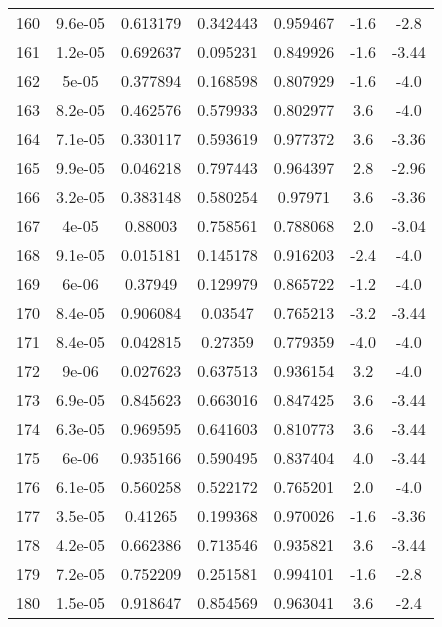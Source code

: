 \begin{table}
\begin{tabular}{c|c|c|c|c|c|c}
160 & 9.6e-05 & 0.613179 & 0.342443 & 0.959467 & -1.6 & -2.8\\
161 & 1.2e-05 & 0.692637 & 0.095231 & 0.849926 & -1.6 & -3.44\\
162 & 5e-05 & 0.377894 & 0.168598 & 0.807929 & -1.6 & -4.0\\
163 & 8.2e-05 & 0.462576 & 0.579933 & 0.802977 & 3.6 & -4.0\\
164 & 7.1e-05 & 0.330117 & 0.593619 & 0.977372 & 3.6 & -3.36\\
165 & 9.9e-05 & 0.046218 & 0.797443 & 0.964397 & 2.8 & -2.96\\
166 & 3.2e-05 & 0.383148 & 0.580254 & 0.97971 & 3.6 & -3.36\\
167 & 4e-05 & 0.88003 & 0.758561 & 0.788068 & 2.0 & -3.04\\
168 & 9.1e-05 & 0.015181 & 0.145178 & 0.916203 & -2.4 & -4.0\\
169 & 6e-06 & 0.37949 & 0.129979 & 0.865722 & -1.2 & -4.0\\
170 & 8.4e-05 & 0.906084 & 0.03547 & 0.765213 & -3.2 & -3.44\\
171 & 8.4e-05 & 0.042815 & 0.27359 & 0.779359 & -4.0 & -4.0\\
172 & 9e-06 & 0.027623 & 0.637513 & 0.936154 & 3.2 & -4.0\\
173 & 6.9e-05 & 0.845623 & 0.663016 & 0.847425 & 3.6 & -3.44\\
174 & 6.3e-05 & 0.969595 & 0.641603 & 0.810773 & 3.6 & -3.44\\
175 & 6e-06 & 0.935166 & 0.590495 & 0.837404 & 4.0 & -3.44\\
176 & 6.1e-05 & 0.560258 & 0.522172 & 0.765201 & 2.0 & -4.0\\
177 & 3.5e-05 & 0.41265 & 0.199368 & 0.970026 & -1.6 & -3.36\\
178 & 4.2e-05 & 0.662386 & 0.713546 & 0.935821 & 3.6 & -3.44\\
179 & 7.2e-05 & 0.752209 & 0.251581 & 0.994101 & -1.6 & -2.8\\
180 & 1.5e-05 & 0.918647 & 0.854569 & 0.963041 & 3.6 & -2.4\\
\end{tabular}
\end{table}
\newpage
